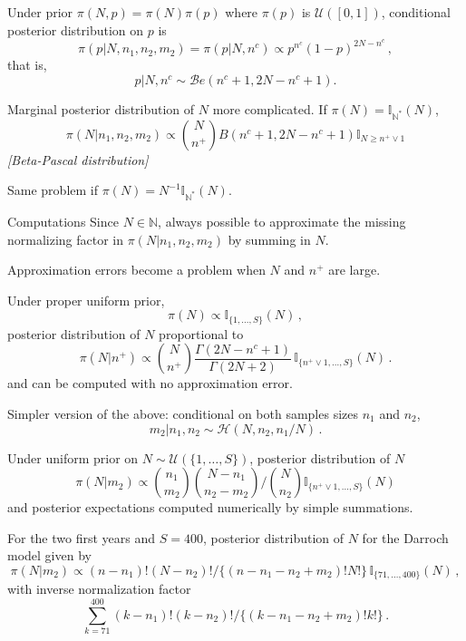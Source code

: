 \begin{slide}
\end{slide}\begin{slide}

Under prior $\pi(N,p)=\pi(N)\pi(p)$ where $\pi(p)$ is  $\mathscr{U}([0,1])$, 
conditional posterior distribution on $p$ is
$$
\pi(p|N,n_1,n_2,m_2)=\pi(p|N,n^c)\propto p^{n^c}(1-p)^{2N-n^c}\,,
$$
that is,
$$
p|N,n^c\sim\mathscr{B}e(n^c+1,2N-n^c+1).
$$

\vs\pause
Marginal posterior distribution of $N$ more complicated. 
If $\pi(N)=\mathbb{I}_{\mathbb{N}^*}(N)$, 
$$
\pi(N|n_1,n_2,m_2)\propto {N \choose n^+}B(n^c+1,2N-n^c+1)\mathbb{I}_{N\geq n^+\vee 1}
$$
{\em [Beta-Pascal distribution]}

\end{slide}\begin{slide}

Same problem if $\pi(N)=N^{-1}\mathbb{I}_{\mathbb{N}^*}(N)$. 

\begin{block}{Computations}
Since $N\in\mathbb{N}$, always possible to approximate the missing
normalizing factor in $\pi(N|n_1,n_2,m_2)$ by summing in $N$. 

Approximation errors become a problem when $N$ and $n^+$ are large.
\end{block}

\vs\pause
Under proper uniform prior,
$$
\pi(N)\propto \mathbb{I}_{\{1,\ldots,S\}}(N)\,,
$$
posterior distribution of $N$ proportional to
$$
\pi(N|n^+)\propto {N \choose n^+}\frac{\Gamma(2N-n^c+1)}{\Gamma(2N+2)}\,\mathbb{I}_{\{n^+\vee 1,\ldots,S\}}(N)\,.
$$
and can be computed with no approximation error.

\end{slide}\begin{slide}

Simpler version of the above: conditional on both samples sizes $n_1$ and $n_2$,
$$
m_2|n_1,n_2 \sim \mathscr{H}(N,n_2,n_1/N)\,.
$$

Under uniform prior on $N\sim\mathscr{U}(\{1,\ldots,S\})$,
posterior distribution of $N$
$$
\pi(N|m_2) \propto {n_1 \choose m_2} {N-n_1\choose n_2-m_2} \bigg/ {N\choose n_2}\mathbb{I}_{\{n^+\vee 1,\ldots,S\}}(N)
$$
and posterior expectations computed numerically by simple summations.
\end{slide}\begin{slide}

For the two first years and $S=400$,
posterior distribution of $N$
for the Darroch model given by
$$
\pi(N|m_2) \propto (n-n_1)!(N-n_2)!\big/\{(n-n_1-n_2+m_2)!N!\}\,\mathbb{I}_{\{71,\ldots,400\}}(N)\,,
$$
with inverse normalization factor 
$$
\sum_{k=71}^{400} (k-n_1)!(k-n_2)!\big/\{(k-n_1-n_2+m_2)!k!\}\,.
$$


\end{slide}
